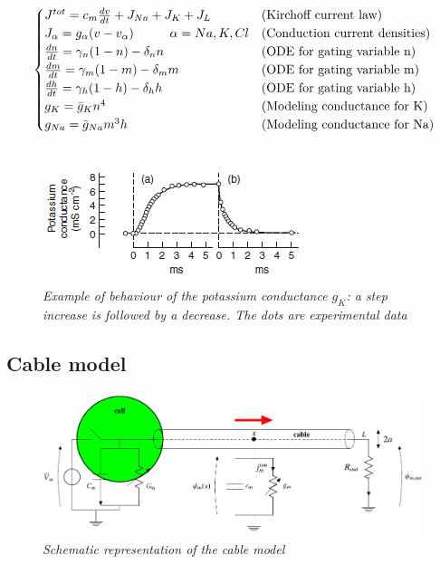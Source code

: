 \documentclass[12pt, a4paper]{article}
\begin{document}
\begin{equation}
\begin{cases}
J^{tot} = c_m \frac{d v}{d t} + J_{Na} + J_K +J_L  & \text{(Kirchoff current law)}\\
J_\alpha = g_\alpha (v-v_\alpha) \hspace{1 cm}  \alpha = Na,K,Cl & \text{(Conduction current densities)}\\
\frac{dn}{dt} = \gamma_n(1-n) - \delta_n n & \text{(ODE for gating variable n)} \\
\frac{dm}{dt} = \gamma_m(1-m) - \delta_m m & \text{(ODE for gating variable m)}\\
\frac{dh}{dt} = \gamma_h(1-h) - \delta_h h & \text{(ODE for gating variable h)}\\
g_K = \bar{g}_K n^4 & \text{(Modeling conductance for K)}\\
g_{Na} = \bar{g}_{Na} m^3h  & \text{(Modeling conductance for Na)}

\end{cases}
\end{equation}

\begin{figure}[H]
	\begin{center}
		\includegraphics[scale=1.1]{gk.png} 
	\end{center} 
	\caption{\textit{Example of behaviour of the potassium conductance $g_K$: a step increase is followed by a decrease. The dots are experimental data}}
	
\end{figure}


\subsection{Cable model}

\begin{figure}[H]
	\begin{center}
		\hspace*{-0.7cm}
		\includegraphics[scale=0.65]{cable.png} 
	\end{center} 
	\caption{\textit{Schematic representation of the cable model}}
	\label{cable}
\end{figure}
\end{document}
